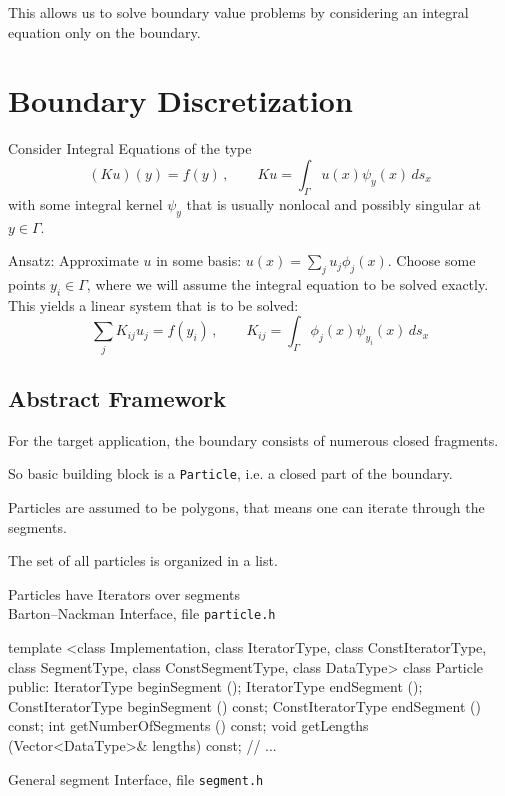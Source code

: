 This allows us to solve boundary value problems by considering an integral equation only on the boundary.

\section {Boundary Discretization}

Consider Integral Equations of the type
\[ (K u)(y) = f(y) \,, \qquad K u = \int_\Gamma u(x) \psi_y(x) \, ds_x \]
with some integral kernel $\psi_y$ that is usually nonlocal and
possibly singular at $y \in \Gamma$.

Ansatz: Approximate $u$ in some basis: $u (x) = \sum_j u_j \phi_j (x)$. Choose some points
$y_i \in \Gamma$, where we will assume the integral equation to be solved exactly. This yields
a linear system that is to be solved:
\[ \sum_j K_{ij} u_j = f(y_i) \,, \qquad K_{ij} = \int_\Gamma \phi_j (x) \psi_{y_i} (x) \, ds_x \]

\subsection {Abstract Framework}

For the target application, the boundary consists of numerous closed fragments.

So basic building block is a \lstinline$Particle$, i.e. a closed part of the boundary.

Particles are assumed to be polygons, that means one can iterate through the segments.

The set of all particles is organized in a list.



Particles have Iterators over segments\\
Barton--Nackman Interface, file \lstinline$particle.h$

\begin{myverbatim}
template <class Implementation, class IteratorType,
 class ConstIteratorType, class SegmentType,
 class ConstSegmentType, class DataType>
  class Particle {
  public:
    IteratorType beginSegment ();
    IteratorType endSegment ();
    ConstIteratorType beginSegment () const;
    ConstIteratorType endSegment () const;
    int getNumberOfSegments () const;
    void getLengths (Vector<DataType>& lengths) const;
    // ...
}
\end{myverbatim}



General segment Interface, file \lstinline$segment.h$

